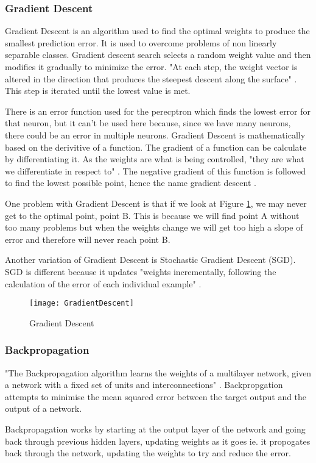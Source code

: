 \subsubsection*{Gradient Descent}
Gradient Descent is an algorithm used to find the optimal weights to produce the
smallest prediction error. It is used to overcome problems of non linearly
separable classes. Gradient descent search selects a random weight value and
then modifies it gradually to minimize the error. "At each step, the weight
vector is altered in the direction that produces the steepest descent along the
surface" \textcite{MLANN}. This step is iterated until the lowest value is met.

There is an error function used for the perecptron which finds the lowest error for that neuron, but it can't be used here because, since we have many neurons, there could be an error in multiple neurons.
Gradient Descent is mathematically based on the derivitive of a function.
The gradient of a function can be calculate by differentiating it.
As the weights are what is being controlled, "they are what we differentiate in respect to" \textcite{MLAlgorithm}.
The negative gradient of this function is followed to find the lowest possible point, hence the name gradient descent \textcite{MLAlgorithm}.

One problem with Gradient Descent is that if we look at Figure \ref{fig:GD}, we may
never get to the optimal point, point B. This is because we will find point A
without too many problems but when the weights change we will get too high a
slope of error and therefore will never reach point B.

Another variation of Gradient Descent is Stochastic Gradient Descent (SGD). SGD
is different because it updates "weights incrementally, following the
calculation of the error of each individual example" \textcite{MLANN}. 

\begin{figure}[h]
      \texttt{[image: GradientDescent]}
      \caption{Gradient Descent}
      \label{fig:GD}
 \end{figure}

\subsubsection*{Backpropagation}
"The Backpropagation algorithm learns the weights of a multilayer network,
given a network with a fixed set of units and interconnections" \textcite{MLANN}.
Backpropgation attempts to minimise the mean squared error between the target
output and the output of a network.

Backpropagation works by starting at the output layer of the network and going
back through previous hidden layers, updating weights as it goes ie. it propogates back through the network, updating the weights to try and reduce the error.
